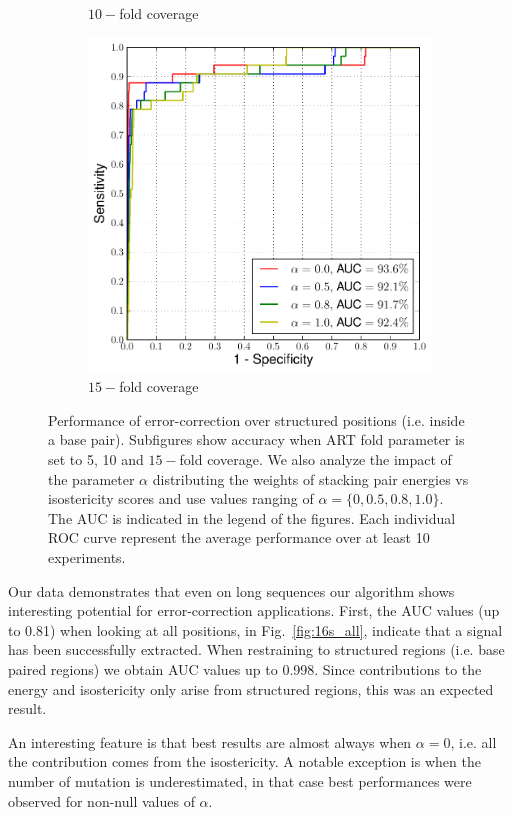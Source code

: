 \begin{figure}
\begin{subfigure}{.33\textwidth}
    \caption{$10-$fold coverage}
\end{subfigure}
\begin{subfigure}{.33\textwidth}
  \centering
  \includegraphics[width=\linewidth]{figures/15fold-b}
    \caption{$15-$fold coverage}
\end{subfigure}
\caption{Performance of error-correction over structured positions (i.e. inside a base pair). Subfigures show accuracy when
ART fold parameter is set to 5, 10 and $15-$fold coverage. We also analyze the impact of the parameter $\alpha$ distributing the weights of stacking pair energies vs isostericity scores and use values ranging of $\alpha = \{0, 0.5, 0.8, 1.0\}$. The AUC is indicated in the legend of the figures. Each individual ROC curve represent the average performance over at least 10 experiments.}
\label{fig:16s_bp}
\end{figure}

Our data demonstrates that even on long sequences our algorithm shows interesting potential for 
error-correction applications. First, the AUC values (up to 0.81) when looking at all positions, 
in Fig.~\ref{fig:16s_all},  indicate that a signal has been successfully extracted. When restraining
to structured regions (i.e. base paired regions) we obtain AUC values up to 0.998.  Since 
contributions to the energy and isostericity only arise from structured regions, this was an expected result.

An interesting feature is that best results are almost always when $\alpha=0$, i.e. all the contribution
comes from the isostericity. A notable exception is when the number of mutation is underestimated, 
in that case best performances were observed for non-null values of $\alpha$.

